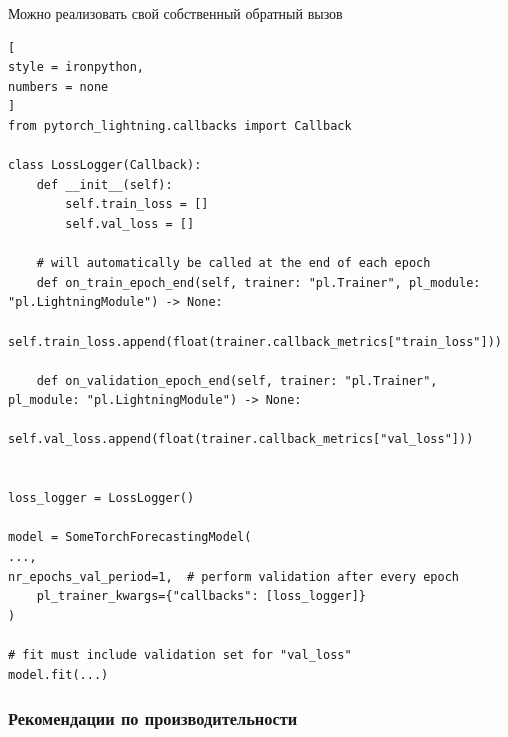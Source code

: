 \documentclass[%
	11pt,
	a4paper,
	utf8,
		]{article}
\begin{document}
Можно реализовать свой собственный обратный вызов
\begin{lstlisting}[
style = ironpython,
numbers = none
]
from pytorch_lightning.callbacks import Callback

class LossLogger(Callback):
	def __init__(self):
		self.train_loss = []
		self.val_loss = []

	# will automatically be called at the end of each epoch
	def on_train_epoch_end(self, trainer: "pl.Trainer", pl_module: "pl.LightningModule") -> None:
		self.train_loss.append(float(trainer.callback_metrics["train_loss"]))

	def on_validation_epoch_end(self, trainer: "pl.Trainer", pl_module: "pl.LightningModule") -> None:
		self.val_loss.append(float(trainer.callback_metrics["val_loss"]))


loss_logger = LossLogger()

model = SomeTorchForecastingModel(
...,
nr_epochs_val_period=1,  # perform validation after every epoch
	pl_trainer_kwargs={"callbacks": [loss_logger]}
)

# fit must include validation set for "val_loss"
model.fit(...)
\end{lstlisting}

\subsubsection{Рекомендации по производительности}
\end{document}
